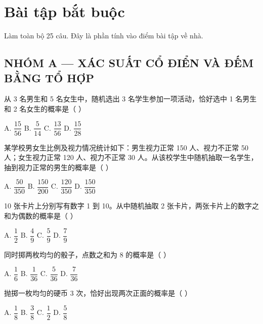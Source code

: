 \documentclass[11pt, a4paper]{article}
\begin{document}

\section{Bài tập bắt buộc}

Làm toàn bộ 25 câu. Đây là phần tính vào điểm bài tập về nhà.

\subsection*{NHÓM A — XÁC SUẤT CỔ ĐIỂN VÀ ĐẾM BẰNG TỔ HỢP}

\begin{baitap}[1]
从 3 名男生和 5 名女生中，随机选出 3 名学生参加一项活动，恰好选中 1 名男生和 2 名女生的概率是（ ）
\par\vspace{3pt}
\noindent A. $\dfrac{15}{56}$ \quad B. $\dfrac{5}{14}$ \quad C. $\dfrac{13}{56}$ \quad D. $\dfrac{15}{28}$
\end{baitap}

\begin{baitap}[2]
某学校男女生比例及视力情况统计如下：男生视力正常 150 人、视力不正常 50 人；女生视力正常 120 人、视力不正常 30 人。从该校学生中随机抽取一名学生，抽到视力正常的男生的概率是（ ）
\par\vspace{3pt}
\noindent A. $\dfrac{50}{350}$ \quad B. $\dfrac{150}{200}$ \quad C. $\dfrac{120}{350}$ \quad D. $\dfrac{150}{350}$
\end{baitap}

\begin{baitap}[3]
10 张卡片上分别写有数字 1 到 10。从中随机抽取 2 张卡片，两张卡片上的数字之和为偶数的概率是（ ）
\par\vspace{3pt}
\noindent A. $\dfrac{1}{2}$ \quad B. $\dfrac{4}{9}$ \quad C. $\dfrac{5}{9}$ \quad D. $\dfrac{7}{9}$
\end{baitap}

\begin{baitap}[4]
同时掷两枚均匀的骰子，点数之和为 8 的概率是（ ）
\par\vspace{3pt}
\noindent A. $\dfrac{1}{6}$ \quad B. $\dfrac{1}{36}$ \quad C. $\dfrac{5}{36}$ \quad D. $\dfrac{7}{36}$
\end{baitap}

\begin{baitap}[5]
抛掷一枚均匀的硬币 3 次，恰好出现两次正面的概率是（ ）
\par\vspace{3pt}
\noindent A. $\dfrac{1}{8}$ \quad B. $\dfrac{3}{8}$ \quad C. $\dfrac{1}{2}$ \quad D. $\dfrac{5}{8}$
\end{baitap}
\end{document}
